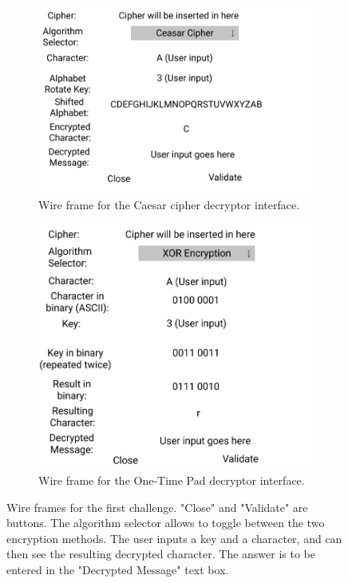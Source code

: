 \documentclass{l4proj}
\begin{document}
\begin{figure}[]
    \centering
    \begin{subfigure}[b]{0.5\textwidth}
        \includegraphics[width=\textwidth, frame]{images/CaesarCipher.png}
        \caption{Wire frame for the Caesar cipher decryptor interface.}
        \label{fig:Caesar}
    \end{subfigure}

    \begin{subfigure}[b]{0.5\textwidth}
        \includegraphics[width=\textwidth, frame]{images/xOR.png}
        \caption{Wire frame for the One-Time Pad decryptor interface.}
        \label{fig:xOR}
    \end{subfigure}
    
    \caption{Wire frames for the first challenge.
    "Close" and "Validate" are buttons.
    The algorithm selector allows to toggle between the two encryption methods.
    The user inputs a key and a character, 
    and can then see the resulting decrypted character.
    The answer is to be entered in the "Decrypted Message" text box.}
    \label{fig:Challenge1}

\end{figure}
\end{document}
